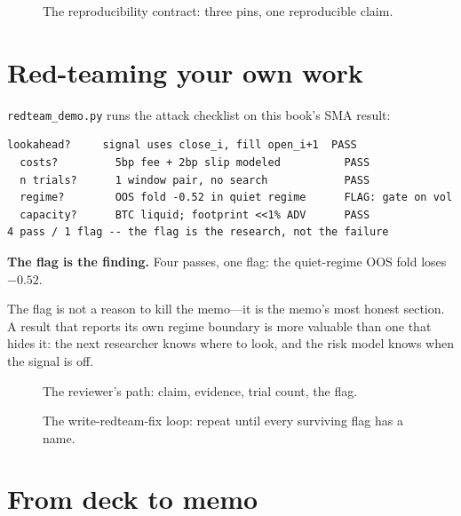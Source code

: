 \begin{figure}[htbp]\centering

\caption{The reproducibility contract: three pins, one reproducible claim.}
\label{fig:repro}
\end{figure}

\section{Red-teaming your own work}\label{sec:redteam}

\texttt{redteam\_demo.py} runs the attack checklist on this book's SMA result:
\begin{lstlisting}[numbers=none]
  lookahead?     signal uses close_i, fill open_i+1  PASS
  costs?         5bp fee + 2bp slip modeled          PASS
  n trials?      1 window pair, no search            PASS
  regime?        OOS fold -0.52 in quiet regime      FLAG: gate on vol
  capacity?      BTC liquid; footprint <<1% ADV      PASS
4 pass / 1 flag -- the flag is the research, not the failure
\end{lstlisting}

\begin{example}\label{ex:redteam}
\textbf{The flag is the finding.} Four passes, one flag: the quiet-regime OOS fold
loses $-0.52$.
\begin{solution}
The flag is not a reason to kill the memo---it is the memo's most honest section. A
result that reports its own regime boundary is more valuable than one that hides it:
the next researcher knows where to look, and the risk model knows when the signal
is off.
\end{solution}
\end{example}

\begin{figure}[htbp]\centering

\caption{The reviewer's path: claim, evidence, trial count, the flag.}
\label{fig:review}
\end{figure}

\begin{figure}[htbp]\centering

\caption{The write-redteam-fix loop: repeat until every surviving flag has a name.}
\label{fig:loop}
\end{figure}

\section{From deck to memo}\label{sec:deck}

